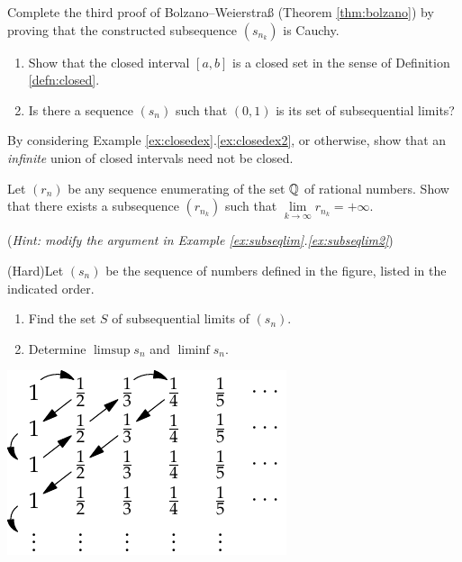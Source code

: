 \begin{exercises}{}{}
\begin{enumerate}
		
		\item\label{exs:bolzano} Complete the third proof of Bolzano--Weierstraß (Theorem \ref{thm:bolzano})  by proving that the constructed subsequence $(s_{n_k})$ is Cauchy.
  
  
  	\item%
  	\begin{enumerate}
  		\item Show that the closed interval $[a,b]$ is a closed set in the sense of Definition \ref{defn:closed}.
  		\item Is there a sequence $(s_n)$ such that $(0,1)$ is its set of subsequential limits?
  	\end{enumerate}
  	
  	 
  	\item By considering Example \ref*{ex:closedex}.\ref{ex:closedex2}, or otherwise, show that an \emph{infinite} union of closed intervals need not be closed.
  
  
  	\item%
  	Let $(r_n)$ be any sequence enumerating of the set $\mathbb{Q}$ of rational numbers. Show that there exists a subsequence $(r_{n_k})$ such that $\lim\limits_{k\to\infty}r_{n_k}=+\infty$.\par
  	(\emph{Hint: modify the argument in Example \ref*{ex:subseqlim}.\ref{ex:subseqlim2}})
  
  
  	\begin{minipage}[t]{0.55\linewidth}\vspace{0pt}
  	\item%
  	(Hard)\lstsp Let $(s_n)$ be the sequence of numbers defined in the figure, listed in the indicated order.
  	\begin{enumerate}
		  \item Find the set $S$ of subsequential limits of $(s_n)$.
		  \item Determine $\limsup s_n$ and $\liminf s_n$.
	  \end{enumerate}
  	\end{minipage}
  	\hfill
  	\begin{minipage}[t]{0.44\linewidth}\vspace{0pt}
  		\flushright\includegraphics[scale=0.95]{diag-arg}
  	\end{minipage}
  
  


	\end{enumerate}
\end{exercises}

